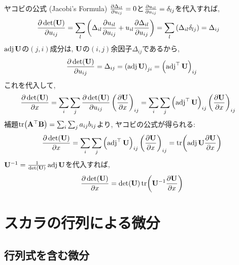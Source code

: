 \documentclass[dvipdfmx,notheorems,t]{beamer}
\begin{document}
\begin{frame}{ヤコビの公式 (Jacobi's Formula)}
$\pdv{\Delta_{il}}{u_{ij}} = 0$と$\pdv{u_{il}}{u_{ij}} = \delta_{lj}$を代入すれば,
\begin{align*}
  \pdv{\det(\vb{U})}{u_{ij}}
    &= \sum_l \left( \Delta_{il} \pdv{u_{il}}{u_{ij}} + u_{il} \pdv{\Delta_{il}}{u_{ij}} \right)
    = \sum_l \left( \Delta_{il} \delta_{lj} \right) = \Delta_{ij}
\end{align*}
$\operatorname{adj} \vb{U}$の$(j, i)$成分は, $\vb{U}$の$(i, j)$余因子$\Delta_{ij}$であるから,
\begin{align*}
  \pdv{\det(\vb{U})}{u_{ij}} = \Delta_{ij}
    = \left( \operatorname{adj} \vb{U} \right)_{ji} = \left( \operatorname{adj}^\top \vb{U} \right)_{ij}
\end{align*}
これを代入して,
\begin{align*}
  \pdv{\det(\vb{U})}{x}
    &= \sum_i \sum_j \pdv{\det(\vb{U})}{u_{ij}} \left( \pdv{\vb{U}}{x} \right)_{ij}
    = \sum_i \sum_j \left( \operatorname{adj}^\top \vb{U} \right)_{ij} \left( \pdv{\vb{U}}{x} \right)_{ij}
\end{align*}
補題$\tr(\vb{A}^\top \vb{B}) = \sum_i \sum_j a_{ij} b_{ij}$より, ヤコビの公式が得られる:
\begin{align*}
  \pdv{\det(\vb{U})}{x}
    = \sum_i \sum_j \left( \operatorname{adj}^\top \vb{U} \right)_{ij} \left( \pdv{\vb{U}}{x} \right)_{ij}
    = \tr(\operatorname{adj} \vb{U} \pdv{\vb{U}}{x})
\end{align*}
$\vb{U}^{-1} = \frac{1}{\det(\vb{U})} \operatorname{adj} \vb{U}$を代入すれば,
\begin{align*}
  \pdv{\det(\vb{U})}{x} = \det(\vb{U}) \tr(\vb{U}^{-1} \pdv{\vb{U}}{x})
\end{align*}
\end{frame}

\section{スカラの行列による微分}
\subsection{行列式を含む微分}
\end{document}
